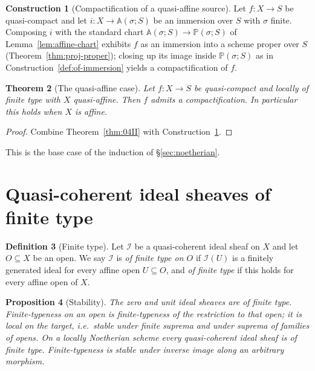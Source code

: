 \documentclass[11pt,a4paper]{article}
\theoremstyle{plain}
\newtheorem{theorem}{Theorem}[section]
\newtheorem{proposition}[theorem]{Proposition}
\theoremstyle{definition}
\newtheorem{definition}[theorem]{Definition}
\newtheorem{construction}[theorem]{Construction}
\theoremstyle{remark}
\newcommand{\sI}{\mathcal{I}}
\newcommand{\Aff}{\mathbb{A}}
\newcommand{\Pj}{\mathbb{P}}
\begin{document}
\begin{construction}[Compactification of a quasi-affine source]
\label{def:affine-compactification}
Let $f\colon X\to S$ be quasi-compact and let $i\colon X\to\Aff(\sigma;S)$ be
an immersion over $S$ with $\sigma$ finite. Composing $i$ with the standard
chart $\Aff(\sigma;S)\to\Pj(\sigma;S)$ of Lemma~\ref{lem:affine-chart} exhibits
$f$ as an immersion into a scheme proper over $S$
(Theorem~\ref{thm:proj-proper}); closing up its image inside $\Pj(\sigma;S)$ as
in Construction~\ref{def:of-immersion} yields a compactification of $f$.
\end{construction}

\begin{theorem}[The quasi-affine case]
\label{thm:quasi-affine-compactifiable}
Let $f\colon X\to S$ be quasi-compact and locally of finite type with $X$
quasi-affine. Then $f$ admits a compactification. In particular this holds when
$X$ is affine.
\end{theorem}

\begin{proof}
Combine Theorem~\ref{thm:04II} with
Construction~\ref{def:affine-compactification}.
\end{proof}

This is the base case of the induction of \S\ref{sec:noetherian}.

\section{Quasi-coherent ideal sheaves of finite type}
\label{sec:finite-type}

\begin{definition}[Finite type]
\label{def:finite-type-ideal}
Let $\sI$ be a quasi-coherent ideal sheaf on $X$ and let $O\subseteq X$ be an
open. We say $\sI$ is \emph{of finite type on $O$} if $\sI(U)$ is a finitely
generated ideal for every affine open $U\subseteq O$, and \emph{of finite type}
if this holds for every affine open of $X$.
\end{definition}

\begin{proposition}[Stability]
\label{prop:finite-type-stability}
The zero and unit ideal sheaves are of finite type. Finite-typeness on an open
is finite-typeness of the restriction to that open; it is local on the target,
i.e.\ stable under finite suprema and under suprema of families of opens. On a
locally Noetherian scheme every quasi-coherent ideal sheaf is of finite type.
Finite-typeness is stable under inverse image along an arbitrary morphism.
\end{proposition}
\end{document}
